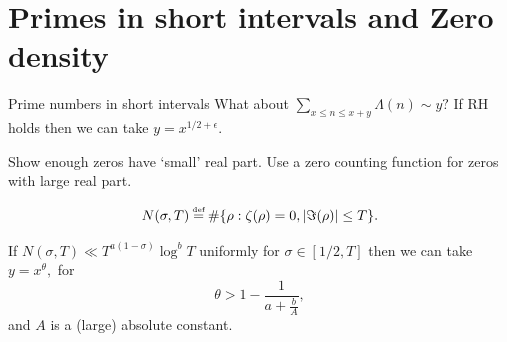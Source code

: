 \documentclass[aspectratio=169,xcolor=dvipsnames]{beamer}
\newcommand\defeq{\mathrel{\stackrel{\makebox[0pt]{\mbox{\normalfont\tiny def}}}{=}}}
\begin{document}
\section{Primes in short intervals and Zero density}
\begin{frame}{Prime numbers in short intervals}
    What about $
        \sum_{x\leq n \leq x+y} \Lambda(n) \sim y?
        $ If RH holds then we can take $y = x^{1/2+\epsilon}$.
    
    Show enough zeros have `small' real part. Use a zero counting function for zeros with large real part.
        
    \begin{definition}
        \[
        N(\sigma,T)\defeq\#\{\rho: \zeta(\rho)=0, |\Im(\rho)|\leq T\}.
        \]
    \end{definition}
    \begin{theorem}[Hoheisel]
    If $N(\sigma,T)\ll T^{a(1-\sigma)}\log^b T$ uniformly for $\sigma\in [1/2,T]$ then we can take $y=x^{\theta},$ for \[
    \theta > 1-\frac{1}{a+\frac{b}{A}},
    \]
    and $A$ is a (large) absolute constant. 
    \end{theorem}
\end{frame}
\end{document}
